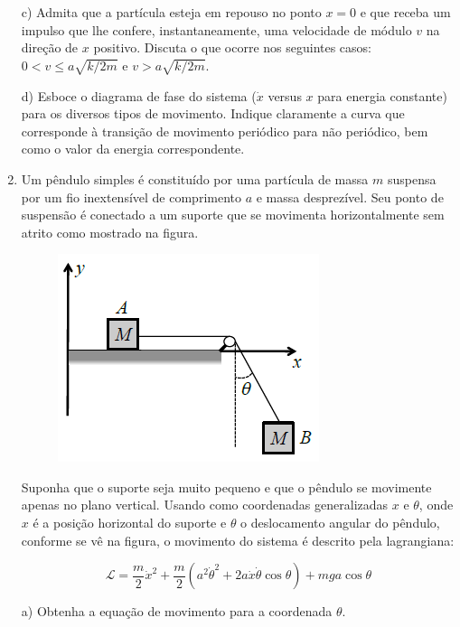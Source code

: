 \begin{enumerate}[start=1,label={\bfseries Q\arabic*.}]
\resposta

c) Admita que a partícula esteja em repouso no ponto $x = 0$ e que receba um impulso que lhe confere, instantaneamente, uma velocidade de módulo $v$ na direção de $x$ positivo. Discuta o que ocorre nos seguintes casos: $0<v \leq a \sqrt{k / 2 m} $ e $ v>a \sqrt{k / 2 m}$.

\resposta

d) Esboce o diagrama de fase do sistema ($\dot{x}$ versus $x$ para energia constante) para os diversos tipos de movimento. Indique claramente a curva que corresponde à transição de movimento periódico para não periódico, bem como o valor da energia correspondente.

\resposta




\item Um pêndulo simples é constituído por uma partícula de massa $m$ suspensa por um fio inextensível de comprimento $a$ e massa desprezível. Seu ponto de suspensão é conectado a um suporte que se movimenta horizontalmente sem atrito como mostrado na figura.

\begin{figure}[H]
\centering
\includegraphics[scale=0.7]{classica-img/pendulo3.png}
\end{figure}

Suponha que o suporte seja muito pequeno e que o pêndulo se movimente apenas no plano vertical. Usando como coordenadas generalizadas $x$ e $\theta$, onde $x$ é a posição horizontal do suporte e $\theta$ o deslocamento angular do pêndulo, conforme se vê na figura, o movimento do sistema é descrito pela lagrangiana:

$$
\mathcal{L}=\frac{m}{2} \dot{x}^{2}+\frac{m}{2}\left(a^{2} \dot{\theta}^{2}+2 a \dot{x} \dot{\theta} \cos \theta\right)+m g a \cos \theta
$$


a) Obtenha a equação de movimento para a coordenada $\theta$.


\end{enumerate}
